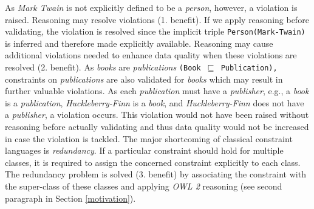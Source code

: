 \documentclass{acm_proc_article-sp}
\newcommand{\ms}[1]{%
  \texttt{#1}
}
\newcommand{\tb}[1]{\todo[size=\small, color=green!40]{\textbf{Thomas:} #1}}
\begin{document}
As \emph{Mark Twain} is not explicitly defined to be a \emph{person}, however, a violation is raised.
Reasoning may resolve violations (1. benefit). If we apply reasoning before validating, the violation is resolved since the implicit triple {\small\ms{Person(Mark-Twain)}} is inferred and therefore made explicitly available. 
Reasoning may cause additional violations needed to enhance data quality when these violations are resolved (2. benefit).
As \emph{books} are \emph{publications} {\small\ms{(Book $\sqsubseteq$ Publication),}} constraints on \emph{publications} are also validated for \emph{books} 
which may result in further valuable violations.
As each \emph{publication} must have a \emph{publisher}, e.g., a \emph{book} is a \emph{publication}, {\em Huckleberry-Finn} is a \emph{book}, and {\em Huckleberry-Finn} does not have a \emph{publisher}, 
a violation occurs.
This violation would not have been raised without reasoning before actually validating and 
thus data quality would not be increased in case the violation is tackled.
The major shortcoming of classical constraint languages is \emph{redundancy}.
If a particular constraint should hold for multiple classes, it is required to assign the concerned constraint explicitly to each class.
The redundancy problem is solved (3. benefit) by associating the constraint with the super-class of these classes and applying \emph{OWL 2} reasoning (see second paragraph in Section \ref{motivation}).

\end{document}
